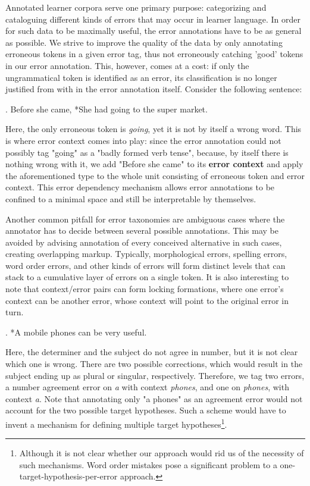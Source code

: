 \documentclass[12pt]{article}
\begin{document}
Annotated learner corpora serve one primary purpose: categorizing and
cataloguing different kinds of errors that may occur in learner language. In
order for such data to be maximally useful, the error annotations have to be as
general as possible. We strive to improve the quality of the data by only
annotating erroneous tokens in a given error tag, thus not erroneously catching
'good' tokens in our error annotation. This, however, comes at a cost: if only
the ungrammatical token is identified as an error, its classification is no
longer justified from with in the error annotation itself. Consider the
following sentence:

\ex. Before she came, *She had going to the super market.

Here, the only erroneous token is \textit{going}, yet it is not by itself a
wrong word. This is where error context comes into play: since the error
annotation could not possibly tag "going" as a "badly formed verb tense", because, by
itself there is nothing wrong with it, we add "Before she came" to its
\textbf{error context} and apply the aforementioned type to the whole unit
consisting of erroneous token and error context. This error dependency mechanism
allows error annotations to be confined to a minimal space and still be
interpretable by themselves.

Another common pitfall for error taxonomies are ambiguous cases where the
annotator has to decide between several possible annotations. This may be
avoided by advising annotation of every conceived alternative in such cases,
creating overlapping markup. Typically, morphological errors, spelling errors,
word order errors, and other kinds of errors will form distinct levels that can
stack to a cumulative layer of errors on a single token. It is also interesting
to note that context/error pairs can form locking formations, where one error's
context can be another error, whose context will point to the original error in
turn.

\ex. *A mobile phones can be very useful.

Here, the determiner and the subject do not agree in number, but it is not clear
which one is wrong. There are two possible corrections, which would result
in the subject ending up as plural or singular, respectively. Therefore, we tag
two errors, a number agreement error on \textit{a} with context \textit{phones}, and
one on \textit{phones}, with context \textit{a}. Note that annotating only "a
phones" as an agreement error would not account for the two possible target
hypotheses. Such a scheme would have to invent a mechanism for defining multiple
target hypotheses\footnote{Although it is not clear whether our approach would
rid us of the necessity of such mechanisms. Word order mistakes pose a
significant problem to a one-target-hypothesis-per-error approach.}.
\end{document}
